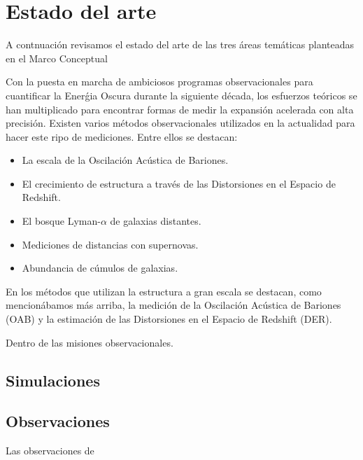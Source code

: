
\section{Estado del arte}

A contnuaci\'on revisamos el estado del arte de las tres \'areas tem\'aticas
planteadas en el Marco Conceptual

Con la puesta en marcha de ambiciosos programas observacionales para
cuantificar la Ener\'gia Oscura durante la siguiente d\'ecada, los
esfuerzos te\'oricos se han  multiplicado para encontrar formas de
medir la expansi\'on acelerada con alta precisi\'on. Existen varios
m\'etodos observacionales utilizados en la actualidad para hacer este
ripo de mediciones. Entre ellos se destacan:

\begin{itemize}
\item La escala de la Oscilaci\'on Ac\'ustica de Bariones.
\item El crecimiento de estructura a trav\'es de las Distorsiones en
  el Espacio de Redshift.
\item El bosque Lyman-$\alpha$ de galaxias distantes.
\item Mediciones de distancias con supernovas.
\item Abundancia de c\'umulos de galaxias.
\end{itemize}


En los m\'etodos
que utilizan la estructura a gran escala se destacan, como
mencion\'abamos m\'as arriba, la medici\'on de la Oscilaci\'on
Ac\'ustica de Bariones (OAB) y la estimaci\'on de las Distorsiones en
el Espacio de Redshift (DER).

Dentro de las misiones observacionales.





\subsection{Simulaciones}


\subsection{Observaciones}

Las observaciones de 

